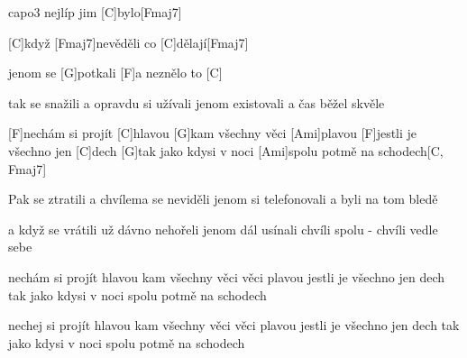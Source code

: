 \hfill capo3
nejlíp jim [C]bylo[Fmaj7]

[C]když [Fmaj7]nevěděli co [C]dělají[Fmaj7]

jenom se [G]potkali
[F]a neznělo to [C]

tak se snažili
a opravdu si užívali
jenom existovali
a čas běžel skvěle


[F]nechám si projít [C]hlavou
[G]kam všechny věci [Ami]plavou
[F]jestli je všechno jen [C]dech
[G]tak jako kdysi v noci
[Ami]spolu potmě na schodech[C, Fmaj7]

\slpc
Pak se ztratili
a chvílema se neviděli
jenom si telefonovali
a byli na tom bledě

a když se vrátili
už dávno nehořeli
jenom dál usínali
chvíli spolu - chvíli vedle sebe

nechám si projít hlavou
kam všechny věci věci plavou
jestli je všechno jen dech
tak jako kdysi v noci
spolu potmě na schodech

nechej si projít hlavou
kam všechny věci věci plavou
jestli je všechno jen dech
tak jako kdysi v noci
spolu potmě na schodech



